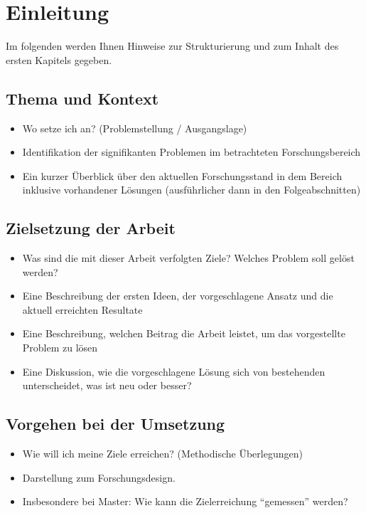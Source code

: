 %
\chapter{Einleitung}
\label{chap:introduction}

Im folgenden werden Ihnen Hinweise zur Strukturierung und zum Inhalt des ersten Kapitels gegeben.

\section{Thema und Kontext}
\begin{itemize}
	\item Wo setze ich an? (Problemstellung / Ausgangslage)      
	\item Identifikation der signifikanten Problemen im betrachteten Forschungsbereich  
	\item Ein kurzer Überblick über den aktuellen Forschungsstand in dem Bereich inklusive vorhandener Lösungen (ausführlicher dann in den Folgeabschnitten)
\end{itemize}

\section{Zielsetzung der Arbeit}
\begin{itemize}
	\item Was sind die mit dieser Arbeit verfolgten Ziele? Welches Problem soll gelöst werden?
	\item Eine Beschreibung der ersten Ideen, der vorgeschlagene Ansatz und die aktuell erreichten Resultate 
	\item Eine Beschreibung, welchen Beitrag die Arbeit leistet, um das vorgestellte Problem zu lösen
	\item Eine Diskussion, wie die vorgeschlagene Lösung sich von bestehenden unterscheidet, was ist neu oder besser?
\end{itemize}

\section{Vorgehen bei der Umsetzung}
\begin{itemize}
	\item Wie will ich meine Ziele erreichen? (Methodische Überlegungen)
	\item Darstellung zum Forschungsdesign.
	\item Insbesondere bei Master: Wie kann die Zielerreichung ``gemessen'' werden? 
\end{itemize}  	

